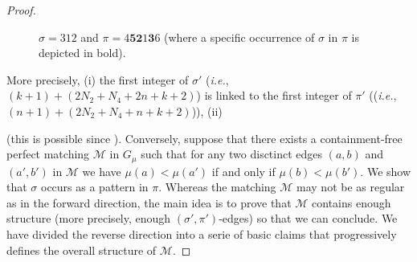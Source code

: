 \documentclass[a4paper,10pt]{llncs}
\begin{document}
\begin{proof}
\begin{figure}[t!]
\begin{tikzpicture}
        \end{tikzpicture}
        \caption{\label{fig:subfig:sigma' - pi' - pi'' - sigma''}%
        $\sigma = 312$ and $\pi = 4\mathbf{5}\mathbf{2}1\mathbf{3}6$
        (where a specific occurrence of $\sigma$ in $\pi$ is depicted in bold).
        }
      \end{figure}

  More precisely,
  (i) the first integer of $\sigma'$
  (\emph{i.e.}, $(k+1) + (2N_2 + N_4 + 2n + k + 2)$) is linked
  to the first integer of $\pi'$
  ((\emph{i.e.}, $(n+1) + (2N_2 + N_4 + n + k + 2)$)),
  (ii)

  (this is possible since ).
  Conversely, suppose that there exists a containment-free perfect matching
  $\mathcal{M}$ in $G_\mu$ such that for any two disctinct edges
  $(a, b)$ and $(a', b')$ in $\mathcal{M}$
  we have $\mu(a) < \mu(a')$ if and only if $\mu(b) < \mu(b')$.
  We show that $\sigma$ occurs as a pattern in $\pi$.
  Whereas the matching $\mathcal{M}$ may not be as regular as in the forward
  direction, the main idea is to prove that $\mathcal{M}$ contains enough structure
  (more precisely, enough $(\sigma', \pi')$-edges) so that we can conclude.
  We have divided the reverse direction into a serie of basic claims that
  progressively defines the overall structure of $\mathcal{M}$.



\end{proof}
\end{document}
